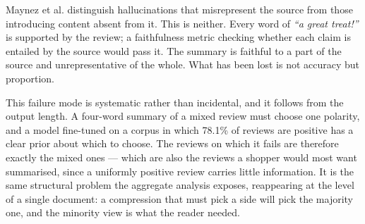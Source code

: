 Maynez et al. \cite{maynez2020faithfulness} distinguish hallucinations that
misrepresent the source from those introducing content absent from it. This is
neither. Every word of \emph{``a great treat!''} is supported by the review; a
faithfulness metric checking whether each claim is entailed by the source would
pass it. The summary is faithful to a part of the source and unrepresentative
of the whole. What has been lost is not accuracy but proportion.

This failure mode is systematic rather than incidental, and it follows from the
output length. A four-word summary of a mixed review must choose one polarity,
and a model fine-tuned on a corpus in which 78.1\% of reviews are positive has
a clear prior about which to choose. The reviews on which it fails are
therefore exactly the mixed ones --- which are also the reviews a shopper would
most want summarised, since a uniformly positive review carries little
information. It is the same structural problem the
aggregate analysis exposes, reappearing at the level of a single document: a
compression that must pick a side will pick the majority one, and the minority
view is what the reader needed.
